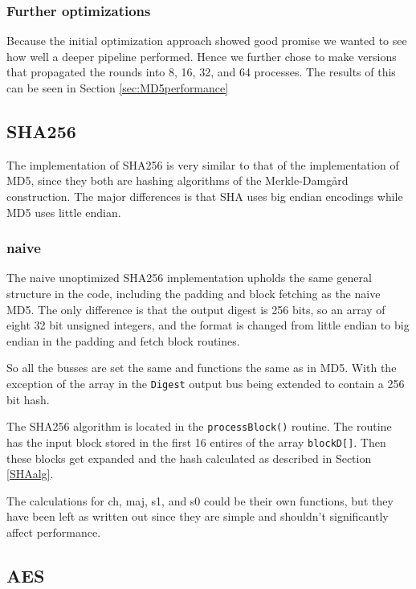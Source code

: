 \documentclass[a4paper]{article}
\begin{document}
\subsubsection{Further optimizations}
\label{sec:orgeda53c9}
Because the initial optimization approach showed good promise we wanted to see how well a deeper pipeline performed. Hence we further chose to make versions that propagated the rounds into 8, 16, 32, and 64 processes. The results of this can be seen in Section \ref{sec:MD5performance}
\subsection{SHA256}
\label{sec:orgceb0e30}
The implementation of SHA256 is very similar to that of the implementation of MD5,
since they both are hashing algorithms of the Merkle-Damgård construction.
The major differences is that SHA uses big endian encodings while MD5 uses little endian.

\subsubsection{naive}
\label{AESnaive}
The naive unoptimized SHA256 implementation upholds the same general structure in the code, including the padding and block fetching as the naive MD5.
The only difference is that the output digest is 256 bits, so an array of eight 32 bit unsigned integers,
and the format is changed from little endian to big endian in the padding and fetch block routines.

So all the busses are set the same and functions the same as in MD5. With the exception of the array in the \texttt{Digest} output bus being extended to contain a 256 bit hash.

The SHA256 algorithm is located in the \texttt{processBlock()} routine.
The routine has the input block stored in the first 16 entires of the array \texttt{blockD[]}.
Then these blocks get expanded and the hash calculated as described in Section \ref{SHAalg}.

The calculations for ch, maj, s1, and s0 could be their own functions, but they have been left as written out since they are simple and shouldn't significantly affect performance.
\subsection{AES}
\label{sec:orgb6eaa25}
\end{document}
